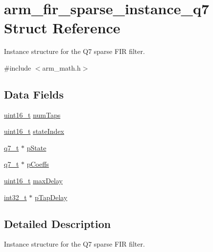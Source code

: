 \hypertarget{structarm__fir__sparse__instance__q7}{\section{arm\-\_\-fir\-\_\-sparse\-\_\-instance\-\_\-q7 Struct Reference}
\label{structarm__fir__sparse__instance__q7}
}


Instance structure for the Q7 sparse F\-I\-R filter.  




{\ttfamily \#include $<$arm\-\_\-math.\-h$>$}

\subsection*{Data Fields}
\begin{DoxyCompactItemize}
\item 
\hyperlink{stdint_8h_a273cf69d639a59973b6019625df33e30}{uint16\-\_\-t} \hyperlink{structarm__fir__sparse__instance__q7_a54cdd27ca1c672b126c38763ce678b1c}{num\-Taps}
\item 
\hyperlink{stdint_8h_a273cf69d639a59973b6019625df33e30}{uint16\-\_\-t} \hyperlink{structarm__fir__sparse__instance__q7_a2d2e65473fe3a3f2b953b4e0b60824df}{state\-Index}
\item 
\hyperlink{arm__math_8h_ae541b6f232c305361e9b416fc9eed263}{q7\-\_\-t} $\ast$ \hyperlink{structarm__fir__sparse__instance__q7_a18072cf3ef3666d588f0d49512f2b28f}{p\-State}
\item 
\hyperlink{arm__math_8h_ae541b6f232c305361e9b416fc9eed263}{q7\-\_\-t} $\ast$ \hyperlink{structarm__fir__sparse__instance__q7_a3dac86f15e33553e8f3e19e0d712bae5}{p\-Coeffs}
\item 
\hyperlink{stdint_8h_a273cf69d639a59973b6019625df33e30}{uint16\-\_\-t} \hyperlink{structarm__fir__sparse__instance__q7_af74dacc1d34c078283e50f2530eb91df}{max\-Delay}
\item 
\hyperlink{group___n_a_m_e_gafd12020da5a235dfcf0c3c748fb5baed}{int32\-\_\-t} $\ast$ \hyperlink{structarm__fir__sparse__instance__q7_ac625393c84bc0342ffdf26fc4eba1ac1}{p\-Tap\-Delay}
\end{DoxyCompactItemize}


\subsection{Detailed Description}
Instance structure for the Q7 sparse F\-I\-R filter. 

